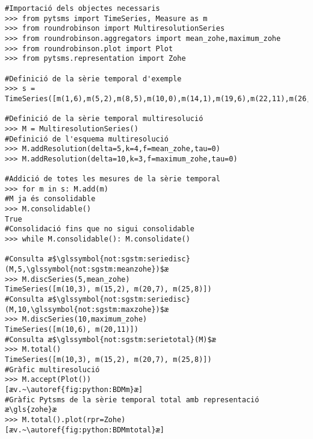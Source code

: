 \begin{lstlisting}[style=py,caption=Exemple d'operacions amb RoundRobinson,label=lst:roundrobinson:ex1]
#Importació dels objectes necessaris
>>> from pytsms import TimeSeries, Measure as m
>>> from roundrobinson import MultiresolutionSeries
>>> from roundrobinson.aggregators import mean_zohe,maximum_zohe
>>> from roundrobinson.plot import Plot
>>> from pytsms.representation import Zohe

#Definició de la sèrie temporal d'exemple
>>> s = TimeSeries([m(1,6),m(5,2),m(8,5),m(10,0),m(14,1),m(19,6),m(22,11),m(26,6),m(29,0)])

#Definició de la sèrie temporal multiresolució
>>> M = MultiresolutionSeries()
#Definició de l'esquema multiresolució
>>> M.addResolution(delta=5,k=4,f=mean_zohe,tau=0)
>>> M.addResolution(delta=10,k=3,f=maximum_zohe,tau=0)

#Addició de totes les mesures de la sèrie temporal
>>> for m in s: M.add(m)
#M ja és consolidable
>>> M.consolidable()
True
#Consolidació fins que no sigui consolidable
>>> while M.consolidable(): M.consolidate()

#Consulta æ$\glssymbol{not:sgstm:seriedisc}(M,5,\glssymbol{not:sgstm:meanzohe})$æ
>>> M.discSeries(5,mean_zohe)
TimeSeries([m(10,3), m(15,2), m(20,7), m(25,8)])
#Consulta æ$\glssymbol{not:sgstm:seriedisc}(M,10,\glssymbol{not:sgstm:maxzohe})$æ
>>> M.discSeries(10,maximum_zohe)
TimeSeries([m(10,6), m(20,11)])
#Consulta æ$\glssymbol{not:sgstm:serietotal}(M)$æ
>>> M.total()
TimeSeries([m(10,3), m(15,2), m(20,7), m(25,8)])
#Gràfic multiresolució
>>> M.accept(Plot())
[æv.~\autoref{fig:python:BDMm}æ]
#Gràfic Pytsms de la sèrie temporal total amb representació æ\gls{zohe}æ
>>> M.total().plot(rpr=Zohe)
[æv.~\autoref{fig:python:BDMmtotal}æ]
\end{lstlisting}



